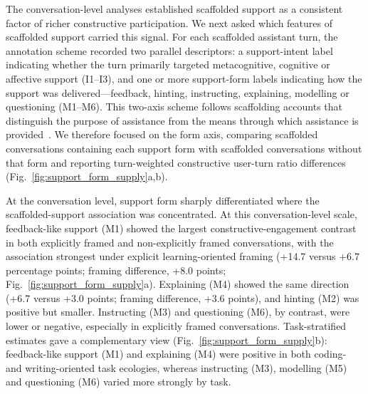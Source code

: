 The conversation-level analyses established scaffolded support as a consistent factor of richer constructive participation. We next asked which features of scaffolded support carried this signal. For each scaffolded assistant turn, the annotation scheme recorded two parallel descriptors: a support-intent label indicating whether the turn primarily targeted metacognitive, cognitive or affective support (I1--I3), and one or more support-form labels indicating how the support was delivered---feedback, hinting, instructing, explaining, modelling or questioning (M1--M6). This two-axis scheme follows scaffolding accounts that distinguish the purpose of assistance from the means through which assistance is provided~\cite{wood1976role,van2010scaffolding,quintana2018scaffolding,winkler2020sara}.  We therefore focused on the form axis, comparing scaffolded conversations containing each support form with scaffolded conversations without that form and reporting turn-weighted constructive user-turn ratio differences (Fig.~\ref{fig:support_form_supply}a,b).

At the conversation level, support form sharply differentiated where the scaffolded-support association was concentrated. At this conversation-level scale, feedback-like support (M1) showed the largest constructive-engagement contrast in both explicitly framed and non-explicitly framed conversations, with the association strongest under explicit learning-oriented framing (+14.7 versus +6.7 percentage points; framing difference, +8.0 points; Fig.~\ref{fig:support_form_supply}a). Explaining (M4) showed the same direction (+6.7 versus +3.0 points; framing difference, +3.6 points), and hinting (M2) was positive but smaller. Instructing (M3) and questioning (M6), by contrast, were lower or negative, especially in explicitly framed conversations. Task-stratified estimates gave a complementary view (Fig.~\ref{fig:support_form_supply}b): feedback-like support (M1) and explaining (M4) were positive in both coding- and writing-oriented task ecologies, whereas instructing (M3), modelling (M5) and questioning (M6) varied more strongly by task.




